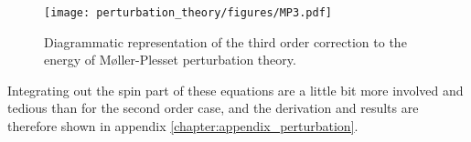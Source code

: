 \begin{figure}
 \begin{center}
  \texttt{[image: perturbation\_theory/figures/MP3.pdf]}
  \caption{Diagrammatic representation of the third order correction to the energy of Møller-Plesset perturbation theory.}
  \label{fig:MP3}
 \end{center}
\end{figure}

Integrating out the spin part of these equations are a little bit more involved and tedious than for the second order case, and the derivation and
results are therefore shown in appendix \ref{chapter:appendix_perturbation}.


